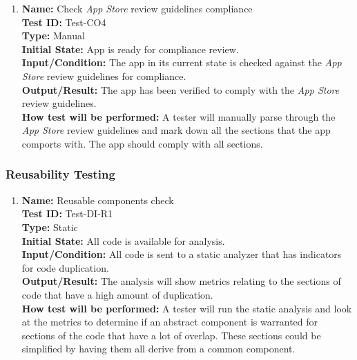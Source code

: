 \documentclass[12pt, titlepage]{article}
\begin{document}
\begin{enumerate}
  \item
        \textbf{Name:} Check \textit{App Store} review guidelines \cite{AppStore} compliance \label{itm:Test-CO4} \\
        \textbf{Test ID:} Test-CO4 \\
        \textbf{Type:} Manual \\
        \textbf{Initial State:} App is ready for compliance review. \\
        \textbf{Input/Condition:} The app in its current state is checked against the \textit{App Store} review guidelines for compliance. \\
        \textbf{Output/Result:} The app has been verified to comply with the \textit{App Store} review guidelines. \\
        \textbf{How test will be performed:} A tester will manually parse through the \textit{App Store} review guidelines and mark down all the sections that the app comports with. The app should comply with all sections.

\end{enumerate}

\subsubsection{Reusability Testing}

\begin{enumerate}

  \item
        \textbf{Name:} Reusable components check \label{itm:Test-DI-R1} \\
        \textbf{Test ID:} Test-DI-R1 \\
        \textbf{Type:} Static \\
        \textbf{Initial State:} All code is available for analysis. \\
        \textbf{Input/Condition:} All code is sent to a static analyzer that has indicators for code duplication. \\
        \textbf{Output/Result:} The analysis will show metrics relating to the sections of code that have a high amount of duplication. \\
        \textbf{How test will be performed:} A tester will run the static analysis and look at the metrics to determine if an abstract component is warranted for sections of the code that have a lot of overlap. These sections could be simplified by having them all derive from a common component.

\end{enumerate}
\end{document}
